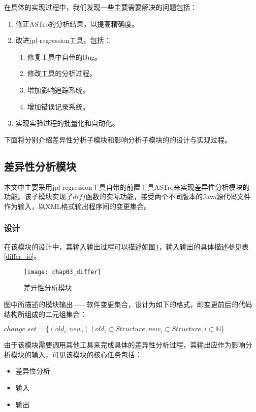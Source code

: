 在具体的实现过程中，我们发现一些主要需要解决的问题包括：
\begin{enumerate}
	\item 修正ASTro的分析结果，以提高精确度。
	\item 改进jpf-regression工具，包括：
		\begin{enumerate}
			\item 修复工具中自带的Bug。
			\item 修改工具的分析过程。
			\item 增加影响追踪系统。
			\item 增加错误记录系统。
		\end{enumerate}
	
	\item 实现实验过程的批量化和自动化。
\end{enumerate}

下面将分别介绍差异性分析子模块和影响分析子模块的的设计与实现过程。

\subsection{差异性分析模块}

本文中主要采用jpf-regression工具自带的前置工具ASTro来实现差异性分析模块的功能。该子模块实现了$diff$函数的实际功能，接受两个不同版本的Java源代码文件作为输入，以XML格式输出程序间的变更集合。

\subsubsection{设计}

在该模块的设计中，其输入输出过程可以描述如图\ref {differ}，输入输出的具体描述参见表\ref {differ_io}。

\begin{figure}[H]
	\centering
	\texttt{[image: chap03\_differ]}
	\caption {差异性分析模块}
	\label {differ}	
\end{figure}

图中所描述的模块输出——软件变更集合，设计为如下的格式，即变更前后的代码结构所组成的二元组集合：
\begin{definition}
	$ change\_set = \{ (old_i,new_i) \mid  old_i \subset Structure,new_i \subset Structure, i \subset \mathbb{N} \}$
\end{definition}

由于该模块需要调用其他工具来完成具体的差异性分析过程，其输出应作为影响分析模块的输入，可见该模块的核心任务包括：
\begin{itemize}
	\item 差异性分析
	\item 输入
	\item 输出
\end{itemize}

